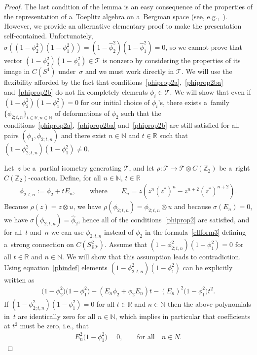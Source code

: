 \documentclass[pdftex]{sigma}
\begin{document}
\begin{proof}
The last condition of the lemma is an easy consequence of the properties of the representation of a~Toeplitz algebra on
a~Bergman space (see, e.g.,~\cite[Theorem~2.8.2]{vasil}).
However, we provide an alternative elementary proof to make the presentation self-contained.
Unfortunately, $\sigma((1-\phi_2^2)(1-\phi_1^2))=(1-\hat\phi_2^2)(1-\hat\phi_1^2)=0$, so we cannot prove that vector
$(1-\phi_2^2)(1-\phi_1^2)\in{\mathcal{T}}$ is nonzero by considering the properties of its image in $C(S^1)$
under~$\sigma$ and we must work directly in ${\mathcal{T}}$.
We will use the f\/lexibility af\/forded by the fact that conditions~\eqref{phiprop2a},~\eqref{phiprop2ba}
and~\eqref{phiprop2b} do not f\/ix completely elements $\phi_i\in{\mathcal{T}}$.
We will show that even if $(1-\phi_2^2)(1-\phi_1^2)=0$ for our initial choice of $\phi_i$'s, there exists a~family
$\{\phi_{2;t,n}\}_{t\in{\mathbb R},n\in{\mathbb N}}$ of deformations of $\phi_2$ such that the
conditions~\eqref{phiprop2a},~\eqref{phiprop2ba} and~\eqref{phiprop2b} are still satisf\/ied for all pairs
$(\phi_1,\phi_{2;t,n})$ and there exist $n\in{\mathbb N}$ and $t\in{\mathbb R}$ such that $(1-\phi_{2;t,n}^2)(1-\phi_1^2)\neq
0$.

Let~$z$ be a~partial isometry generating ${\mathcal{T}}$, and let $\rho:{\mathcal{T}}\rightarrow{\mathcal{T}}\otimes
C({\mathbb Z_2})$ be a~right $C({\mathbb Z_2})$-coaction.
Def\/ine, for all $n\in{\mathbb N}$, $t\in{\mathbb R}$
\begin{gather}
\phi_{2;t,n}:=\phi_2+tE_n,
\qquad
\text{where}
\qquad
E_n=z\left(z^n(z^*)^n-z^{n+2}(z^*)^{n+2}\right).
\label{phindef}
\end{gather}
Because $\rho(z)=z\otimes u$, we have $\rho(\phi_{2;t,n})=\phi_{2;t,n}\otimes u$ and because $\sigma(E_n)=0$, we have
$\sigma(\phi_{2;t,n})=\hat\phi_2$, hence all of the conditions~\eqref{phiprop2} are satisf\/ied, and for all~$t$ and~$n$
we can use $\phi_{2;t,n}$ instead of $\phi_2$ in the formula~\eqref{ellform3} def\/ining a~strong connection on
${C(S^2_{\mathbb{R}\mathcal{T}})}$.
Assume that $(1-\phi_{2;t,n}^2)(1-\phi_1^2)=0$ for all $t\in{\mathbb R}$ and $n\in{\mathbb N}$.
We will show that this assumption leads to contradiction.
Using equation~\eqref{phindef} elements $(1-\phi_{2;t,n}^2)(1-\phi_1^2)$ can be explicitly written as
\begin{gather*}
\big(1-\phi_2^2\big)\big(1-\phi_1^2\big)-(E_n\phi_2+\phi_2E_n)t-(E_n)^2\big(1-\phi_1^2\big)t^2.
\end{gather*}
If $(1-\phi_{2;t,n}^2)(1-\phi_1^2)=0$ for all $t\in{\mathbb R}$ and $n\in{\mathbb N}$ then the above polynomials in~$t$ are
identically zero for all $n\in{\mathbb N}$, which implies in particular that coef\/f\/icients at $t^2$ must be zero, i.e., that
\begin{gather}
\label{absurdcond}
E_n^2\big(1-\phi_1^2\big)=0,
\qquad
\text{for all}
\quad
n\in N.
\end{gather}


\end{proof}
\end{document}
